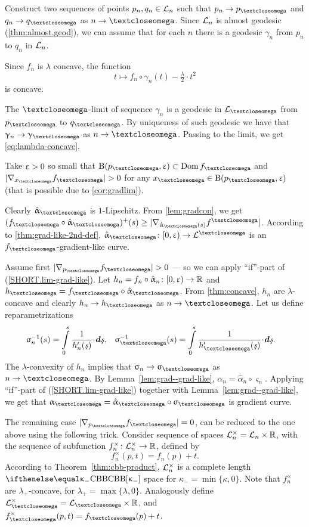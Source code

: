 Construct two sequences of points $p_n,q_n\in\spc{L}_n$ such that $p_n\to p_\o$ and $q_n\to q_\o$ as $n\to \o$.
Since $\mathcal{L}_n$ is almost geodesic (\ref{thm:almost.geod}), we can assume that for each $n$ there is a geodesic $\gamma_n$ from $p_n$ to $q_n$ in $\mathcal{L}_n$. 

Since $f_n$ is $\lambda$ concave, the function 
\[t\mapsto f_n\circ\gamma_n(t)-\tfrac\lambda 2\cdot t^2\]
is concave.

The $\o$-limit of sequence $\gamma_n$ is a geodesic in $\spc{L}_\o$ from $p_\o$ to $q_\o$.
By uniqueness of such geodesic we have that $\gamma_n\to \gamma_\o$ as $n\to \o$.
Passing to the limit, we get \ref{eq:lambda-concave}.

Take $\upvarepsilon>0$ so small that $\oBall(p_\o,\eps)\subset\Dom f_\o$ and $|\nabla_{x_\o}f_\o|>0$ for any $x_\o\in\oBall(p_\o,\eps)$ (that is possible due to \ref{cor:gradlim}).

Clearly $\hat\alpha_\o$ is $1$-Lipschitz.
From \ref{lem:gradcon}, we get 
$(f_\o\circ\hat\alpha_\o)^+(s)
\ge
|\nabla_{\hat\alpha_\o(s)}f^\o|$.
According to \ref{thm:grad-like-2nd-def}, $\hat\alpha_\o\:[0,\eps)\to \spc{L}^\o$  is an $f_\o$-gradient-like curve.

 Assume first $|\nabla_{p_\o}f_\o|>0$ ---
so we can apply ``if''-part of (\ref{SHORT.lim-grad-like}).
Let $h_n=f_n\circ\hat\alpha_n\:[0,\eps)\to \RR$ 
and $h_\o=f_\o\circ\hat\alpha_\o$.
From \ref{thm:concave}, $h_n$ are $\lambda$-concave and clearly $h_n\to h_\o$ as $n\to\o$.
Let us define reparametrizations
\begin{align*}
{\varsigma_n^{-1}(s)}
&=
\int\limits_0^{s}\frac{1}{h_n'(\under s)}\cdot\d\under s,
&
{\varsigma_\o^{-1}(s)}
&=
\int\limits_0^{s}\frac{1}{h_\o'(\under s)}\cdot\d\under s.
\end{align*}
The $\lambda$-convexity of $h_n$ implies that $\sigma_n\to\sigma_\o$ as $n\to\o$.
By Lemma~\ref{lem:grad--grad-like}, 
$\alpha_n=\hat\alpha_n\circ\varsigma_n$.
Applying ``if''-part of (\ref{SHORT.lim-grad-like}) together with Lemma~\ref{lem:grad--grad-like},
we get that $\alpha_\o=\hat\alpha_\o\circ\varsigma_\o$ is gradient curve.

The remaining case $|\nabla_{p_\o}f_\o|=0$, can be reduced to the one above using the following trick.
Consider sequence of spaces $\spc{L}_n^{\times}=\spc{L}_n\times\RR$,
with the sequence of subfunction $f^{\times}_n\:\spc{L}_n^{\times}\to\RR$, defined by
\[f^{\times}_n(p,t)=f_n(p)+t.\]
According to Theorem~\ref{thm:cbb-product}, 
$\spc{L}_n^{\times}$ is a complete length $\Alex{\kappa_-}$ space for $\kappa_-=\min\{\kappa,0\}$.
Note that $f_n^{\times}$ are $\lambda_+$-concave,
for $\lambda_+=\max\{\lambda,0\}$.
Analogously define  $\spc{L}_\o^{\times}=\spc{L}_\o\times\RR$,
and $f^{\times}_\o(p,t)=f_\o(p)+t$.

